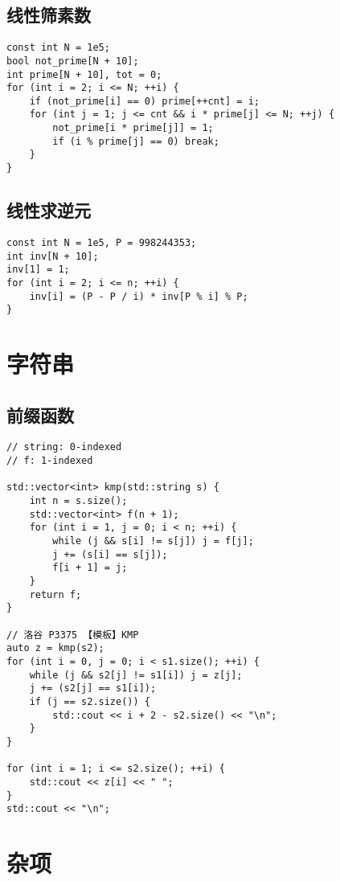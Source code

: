 \documentclass{ctexart}
\begin{document}
\subsection{线性筛素数}
\begin{verbatim}
const int N = 1e5;
bool not_prime[N + 10];
int prime[N + 10], tot = 0;
for (int i = 2; i <= N; ++i) {
    if (not_prime[i] == 0) prime[++cnt] = i;
    for (int j = 1; j <= cnt && i * prime[j] <= N; ++j) {
        not_prime[i * prime[j]] = 1;
        if (i % prime[j] == 0) break;
    }
}
\end{verbatim}

\subsection{线性求逆元}
\begin{verbatim}
const int N = 1e5, P = 998244353;
int inv[N + 10];
inv[1] = 1;
for (int i = 2; i <= n; ++i) {
    inv[i] = (P - P / i) * inv[P % i] % P;
}
\end{verbatim}

\section{字符串}
\subsection{前缀函数}
\begin{verbatim}
// string: 0-indexed
// f: 1-indexed

std::vector<int> kmp(std::string s) {
    int n = s.size();
    std::vector<int> f(n + 1);
    for (int i = 1, j = 0; i < n; ++i) {
        while (j && s[i] != s[j]) j = f[j];
        j += (s[i] == s[j]);
        f[i + 1] = j;
    }
    return f;
}

// 洛谷 P3375 【模板】KMP
auto z = kmp(s2);
for (int i = 0, j = 0; i < s1.size(); ++i) {
    while (j && s2[j] != s1[i]) j = z[j];
    j += (s2[j] == s1[i]);
    if (j == s2.size()) {
        std::cout << i + 2 - s2.size() << "\n";
    }
}

for (int i = 1; i <= s2.size(); ++i) {
    std::cout << z[i] << " ";
}
std::cout << "\n";
\end{verbatim}

\section{杂项}
\end{document}

